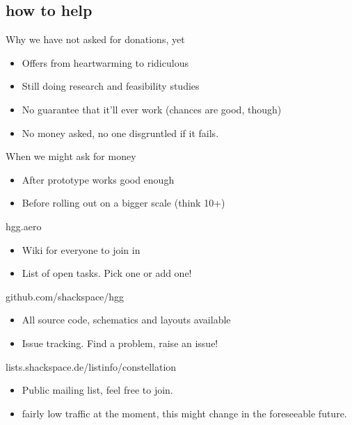 \subsection{how to help}
	\begin{frame}{Why we have not asked for donations, yet}
		\begin{itemize}
			\item Offers from heartwarming to ridiculous
			\item Still doing research and feasibility studies
			\item No guarantee that it'll ever work (chances are good, though)
			\item No money asked, no one disgruntled if it fails.
		\end{itemize}
	\end{frame}
	\begin{frame}{When we might ask for money}
		\begin{itemize}
			\item After prototype works good enough
			\item Before rolling out on a bigger scale (think 10+)
		\end{itemize}
	\end{frame}
	\begin{frame}{hgg.aero}
		\begin{itemize}
			\item Wiki for everyone to join in
			\item List of open tasks.  Pick one or add one!
		\end{itemize}
	\end{frame}
	\begin{frame}{github.com/shackspace/hgg}
		\begin{itemize}
			\item All source code, schematics and layouts available
			\item Issue tracking.  Find a problem, raise an issue!
		\end{itemize}
	\end{frame}
	\begin{frame}{lists.shackspace.de/listinfo/constellation}
		\begin{itemize}
			\item Public mailing list, feel free to join.
			\item fairly low traffic at the moment, this might change in the foreseeable future.
		\end{itemize}
	\end{frame}



